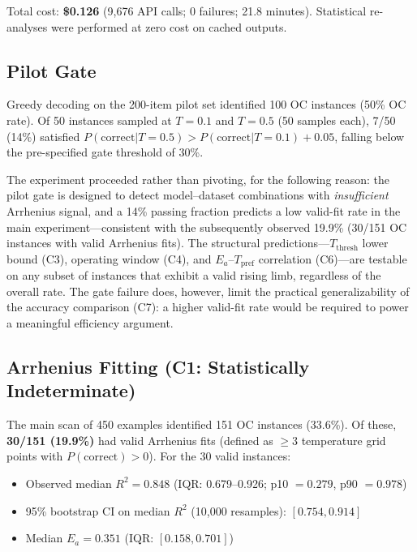 \documentclass[11pt,letterpaper,twocolumn]{article}
\begin{document}
Total cost: \textbf{\$0.126} (9,676 API calls; 0 failures; 21.8 minutes). Statistical
re-analyses were performed at zero cost on cached outputs.

\subsection{Pilot Gate}

Greedy decoding on the 200-item pilot set identified 100 OC instances (50\% OC rate). Of
50 instances sampled at $T = 0.1$ and $T = 0.5$ (50 samples each), 7/50 (14\%) satisfied
$P(\text{correct}|T=0.5) > P(\text{correct}|T=0.1) + 0.05$, falling below the
pre-specified gate threshold of 30\%.

The experiment proceeded rather than pivoting, for the following reason: the pilot gate
is designed to detect model--dataset combinations with \emph{insufficient} Arrhenius
signal, and a 14\% passing fraction predicts a low valid-fit rate in the main
experiment---consistent with the subsequently observed 19.9\% (30/151 OC instances with
valid Arrhenius fits). The structural predictions---$T_\text{thresh}$ lower bound (C3),
operating window (C4), and $E_a$--$T_\text{pref}$ correlation (C6)---are testable on any
subset of instances that exhibit a valid rising limb, regardless of the overall rate. The
gate failure does, however, limit the practical generalizability of the accuracy comparison
(C7): a higher valid-fit rate would be required to power a meaningful efficiency argument.

\subsection{Arrhenius Fitting (C1: Statistically Indeterminate)}

The main scan of 450 examples identified 151 OC instances (33.6\%). Of these, \textbf{30/151
(19.9\%)} had valid Arrhenius fits (defined as $\geq 3$ temperature grid points with
$P(\text{correct}) > 0$). For the 30 valid instances:
\begin{itemize}[leftmargin=*,topsep=2pt,itemsep=2pt]
  \item Observed median $R^2 = 0.848$ (IQR: 0.679--0.926; p10 $= 0.279$, p90 $= 0.978$)
  \item 95\% bootstrap CI on median $R^2$ (10,000 resamples): $[0.754, 0.914]$
  \item Median $E_a = 0.351$ (IQR: $[0.158, 0.701]$)
\end{itemize}
\end{document}
